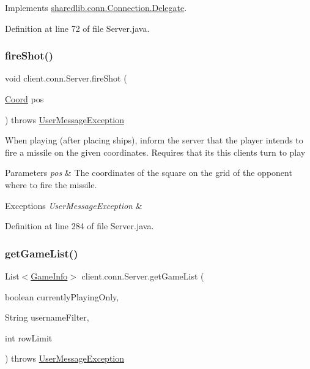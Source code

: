 Implements \hyperlink{interfacesharedlib_1_1conn_1_1_connection_1_1_delegate_a64e49ea25180c770c2cbc1953fd79fed}{sharedlib.\+conn.\+Connection.\+Delegate}.



Definition at line 72 of file Server.\+java.

\hypertarget{classclient_1_1conn_1_1_server_ab1d2fa19e855a803efff54edd2113d83}{}\label{classclient_1_1conn_1_1_server_ab1d2fa19e855a803efff54edd2113d83} 
\subsubsection{\texorpdfstring{fire\+Shot()}{fireShot()}}
{\footnotesize\ttfamily void client.\+conn.\+Server.\+fire\+Shot (\begin{DoxyParamCaption}\item[{\hyperlink{classsharedlib_1_1utils_1_1_coord}{Coord}}]{pos }\end{DoxyParamCaption}) throws \hyperlink{classsharedlib_1_1exceptions_1_1_user_message_exception}{User\+Message\+Exception}}

When playing (after placing ships), inform the server that the player intends to fire a missile on the given coordinates. Requires that it\textquotesingle{}s this client\textquotesingle{}s turn to play 
\begin{DoxyParams}{Parameters}
{\em pos} & The coordinates of the square on the grid of the opponent where to fire the missile. \\
\hline
\end{DoxyParams}

\begin{DoxyExceptions}{Exceptions}
{\em User\+Message\+Exception} & \\
\hline
\end{DoxyExceptions}


Definition at line 284 of file Server.\+java.

\hypertarget{classclient_1_1conn_1_1_server_ab1f159361ca4682e87f2cea6224f094a}{}\label{classclient_1_1conn_1_1_server_ab1f159361ca4682e87f2cea6224f094a} 
\subsubsection{\texorpdfstring{get\+Game\+List()}{getGameList()}}
{\footnotesize\ttfamily List$<$\hyperlink{classsharedlib_1_1tuples_1_1_game_info}{Game\+Info}$>$ client.\+conn.\+Server.\+get\+Game\+List (\begin{DoxyParamCaption}\item[{boolean}]{currently\+Playing\+Only,  }\item[{String}]{username\+Filter,  }\item[{int}]{row\+Limit }\end{DoxyParamCaption}) throws \hyperlink{classsharedlib_1_1exceptions_1_1_user_message_exception}{User\+Message\+Exception}}

